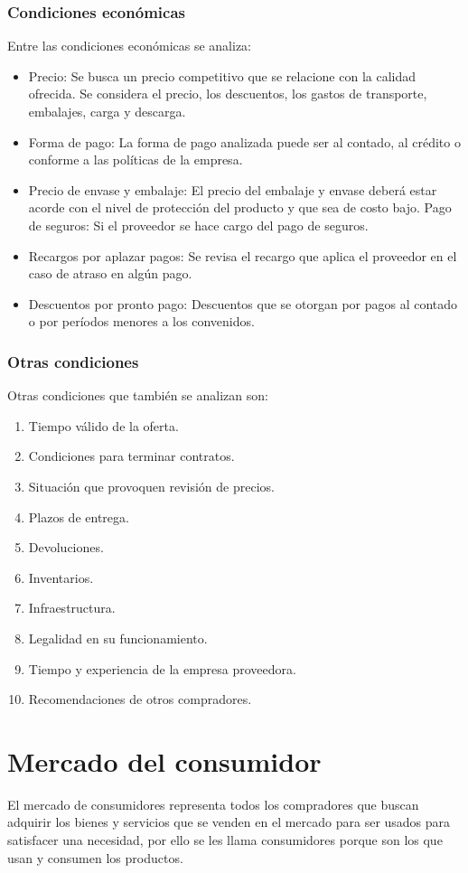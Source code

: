 \documentclass[../main]{subfiles}
\begin{document}
\subsubsection{Condiciones económicas}
Entre las condiciones económicas se analiza:
\begin{itemize}
  \item Precio: Se busca un precio competitivo que se relacione con
    la calidad ofrecida. Se considera el precio, los descuentos, los
    gastos de transporte, embalajes, carga y descarga.
  \item Forma de pago: La forma de pago analizada puede ser al
    contado, al crédito o conforme a las políticas de la empresa.
  \item Precio de envase y embalaje: El precio del embalaje y envase
    deberá estar acorde con el nivel de protección del producto y que
    sea de costo bajo.
    Pago de seguros: Si el proveedor se hace cargo del pago de seguros.
  \item Recargos por aplazar pagos: Se revisa el recargo que aplica
    el proveedor en el caso de atraso en algún pago.
  \item Descuentos por pronto pago: Descuentos que se otorgan por
    pagos al contado o por períodos menores a los convenidos.
\end{itemize}
\subsubsection{Otras condiciones}
Otras condiciones que también se analizan son:
\begin{enumerate}
  \item Tiempo válido de la oferta.
  \item Condiciones para terminar contratos.
  \item Situación que provoquen revisión de precios.
  \item Plazos de entrega.
  \item Devoluciones.
  \item Inventarios.
  \item Infraestructura.
  \item Legalidad en su funcionamiento.
  \item Tiempo y experiencia de la empresa proveedora.
  \item Recomendaciones de otros compradores.
\end{enumerate}
\section{Mercado del consumidor}
El mercado de consumidores representa todos los compradores que
buscan adquirir los bienes y servicios que se venden en el mercado
para ser usados para satisfacer una necesidad, por ello se les llama
consumidores porque son los que usan y consumen los productos.
\end{document}
